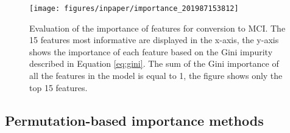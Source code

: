 \documentclass[preprint,12pt]{elsarticle}
\begin{document}
\begin{figure}[!htb]
        \centering
        \texttt{[image: figures/inpaper/importance\_201987153812]}
        \caption{Evaluation of the importance of features for conversion to MCI. The 15  features most informative are displayed in the x-axis, the y-axis shows the importance of each feature based on the Gini impurity described in Equation \ref{eq:gini}. The sum of the Gini importance of all the features in the model is equal to 1, the figure shows only the top 15 features.} 
        \label{fig:RF_selectorgini}
\end{figure}

\subsection{Permutation-based importance methods}
\end{document}
